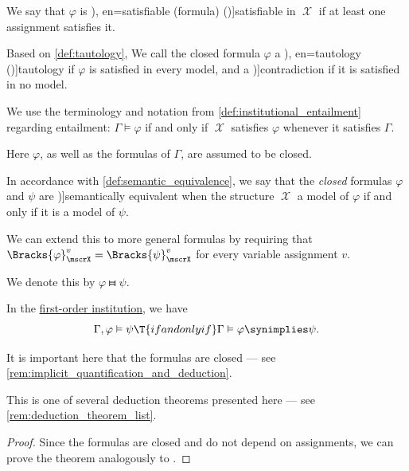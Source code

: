 \begin{definition}
\begin{thmenum}
    We say that \( \varphi \) is \term[ru=выполнимая (формула) (\cite[def. 2.4.1]{Герасимов2014Вычислимость}), en=satisfiable (formula) (\cite[71]{VanDalen2004LogicAndStructure})]{satisfiable} in \( \mscrX \) if at least one assignment satisfies it.

     Based on \cref{def:tautology}, We call the closed formula \( \varphi \) a \term[ru=тавтология (\cite[def. 2.4.1]{Герасимов2014Вычислимость}), en=tautology (\cite[97]{Hinman2005Logic})]{tautology} if \( \varphi \) is satisfied in every model, and a \term[ru=противоречивая формула (\cite[def. 2.4.1]{Герасимов2014Вычислимость})]{contradiction} if it is satisfied in no model.

     We use the terminology and notation from \cref{def:institutional_entailment} regarding entailment: \( \Gamma \vDash \varphi \) if and only if \( \mscrX \) satisfies \( \varphi \) whenever it satisfies \( \Gamma \).

    Here \( \varphi \), as well as the formulas of \( \Gamma \), are assumed to be closed.

     In accordance with \cref{def:semantic_equivalence}, we say that the \emph{closed} formulas \( \varphi \) and \( \psi \) are \term[en=logically equivalent (formulas) (\cite[def. 2.2.1(ii)]{Hinman2005Logic})]{semantically equivalent} when the structure \( \mscrX \) a model of \( \varphi \) if and only if it is a model of \( \psi \).

    We can extend this to more general formulas by requiring that \( \Bracks{\varphi}_\mscrX^v = \Bracks{\psi}_\mscrX^v \) for every variable assignment \( v \).

    We denote this by \( \varphi \gleichstark \psi \).
  \end{thmenum}
\end{definition}

\begin{theorem}\label{thm:fol_semantic_deduction_theorem}
  In the \hyperref[def:fol_institution]{first-order institution}, we have
  \begin{equation*}
    \Gamma, \varphi \vDash \psi \T{if and only if} \Gamma \vDash \varphi \synimplies \psi.
  \end{equation*}
\end{theorem}
\begin{comments}
  \item It is important here that the formulas are closed --- see \cref{rem:implicit_quantification_and_deduction}.
  \item This is one of several deduction theorems presented here --- see \cref{rem:deduction_theorem_list}.
\end{comments}
\begin{proof}
  Since the formulas are closed and do not depend on assignments, we can prove the theorem analogously to .
\end{proof}

